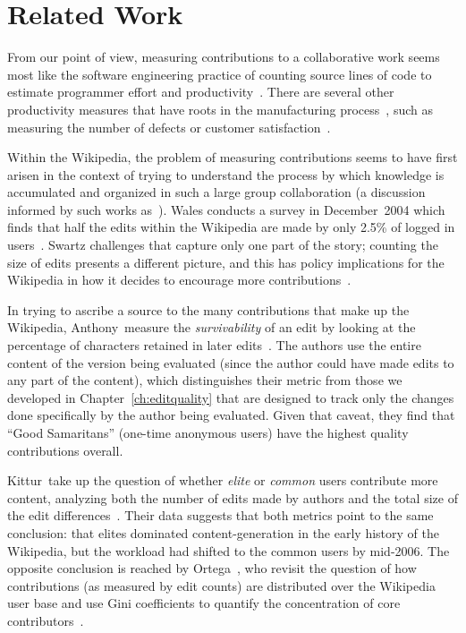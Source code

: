 \section{Related Work}

From our point of view, measuring contributions to a collaborative
work seems most like the software engineering practice of counting
source lines of code to estimate programmer effort and
productivity~\cite{Schultz1988,Park1992}.
There are several other productivity measures that have
roots in the manufacturing process~\cite{Diewart2005},
such as measuring the number of defects or customer
satisfaction~\cite{Tennant2001}.

Within the Wikipedia, the problem of measuring contributions
seems to have first arisen in the context of trying to understand
the process by which knowledge is accumulated and organized
in such a large group collaboration (a discussion informed
by such works
as~\cite{Butler2002,Benkler2002,Surowiecki2004,Reagle2004}).
Wales conducts a survey in December~2004 which finds that half
the edits within the Wikipedia are made by only 2.5\% of logged
in users~\cite{Wales2005}.
Swartz challenges that  capture only one part of the
story; counting the size of edits presents a different picture,
and this has policy implications for the Wikipedia in how
it decides to encourage more contributions~\cite{Swartz2006}.

In trying to ascribe a source to the many contributions
that make up the Wikipedia, Anthony~\etal measure the
\textit{survivability} of an edit by looking at the percentage of
characters retained in later edits~\cite{Anthony2005}.
The authors use the entire content of the version being
evaluated (since the author could have made edits to any
part of the content), which distinguishes their metric
from those we developed in Chapter~\ref{ch:editquality}
that are designed to track only the changes done specifically
by the author being evaluated.
Given that caveat, they find that ``Good Samaritans'' (one-time
anonymous users) have the highest quality contributions overall.

Kittur~\etal take up the question of whether \textit{elite}
or \textit{common} users contribute more content, analyzing both
the number of edits made by authors and the total size of the
edit differences~\cite{Kittur2007}.
Their data suggests that both metrics point to the same
conclusion: that elites dominated content-generation in the early
history of the Wikipedia, but the workload had shifted to
the common users by mid-2006.
The opposite conclusion is reached by Ortega~\etal,
who revisit the question of how contributions (as measured by
edit counts) are distributed over the Wikipedia user base and use
Gini coefficients to quantify the concentration of
core contributors~\cite{Ortega2008}.

